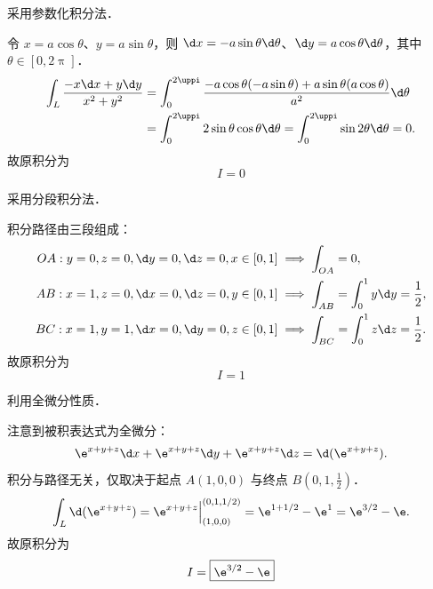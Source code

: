 \begin{solution}
    采用参数化积分法．

    令 $x = a \cos \theta$、$y = a \sin \theta$，则 $\d x = -a \sin \theta \d \theta$、$\d y = a \cos \theta \d \theta$，其中 $\theta \in [0, 2\uppi]$．
    \begin{equation}
        \begin{aligned}
            \int_L \frac{-x \d x + y \d y}{x^2 + y^2} & = \int_0^{2\uppi} \frac{-a \cos \theta (-a \sin \theta) + a \sin \theta (a \cos \theta)}{a^2} \d \theta \\
                                                      & = \int_0^{2\uppi} 2 \sin \theta \cos \theta \d \theta = \int_0^{2\uppi} \sin 2\theta \d \theta = 0.
        \end{aligned}
    \end{equation}
    故原积分为
    \begin{equation}
        I = \boxed{0}
    \end{equation}

    采用分段积分法．

    积分路径由三段组成：
    \begin{equation}
        \begin{aligned}
            OA: y=0, z=0, \d y=0, \d z=0, x \in [0, 1] & \implies \int_{OA} = 0,                             \\
            AB: x=1, z=0, \d x=0, \d z=0, y \in [0, 1] & \implies \int_{AB} = \int_0^1 y \d y = \frac{1}{2}, \\
            BC: x=1, y=1, \d x=0, \d y=0, z \in [0, 1] & \implies \int_{BC} = \int_0^1 z \d z = \frac{1}{2}.
        \end{aligned}
    \end{equation}
    故原积分为
    \begin{equation}
        I = \boxed{1}
    \end{equation}

    利用全微分性质．

    注意到被积表达式为全微分：
    \begin{equation}
        \e^{x+y+z} \d x + \e^{x+y+z} \d y + \e^{x+y+z} \d z = \d (\e^{x+y+z}).
    \end{equation}
    积分与路径无关，仅取决于起点 $A(1,0,0)$ 与终点 $B(0,1,\frac{1}{2})$．
    \begin{equation}
        \int_L \d (\e^{x+y+z}) = \e^{x+y+z} \Big|_{(1,0,0)}^{(0,1,1/2)} = \e^{1+1/2} - \e^1 = \e^{3/2} - \e.
    \end{equation}
    故原积分为
    \begin{equation}
        I = \boxed{\e^{3/2} - \e}
    \end{equation}


\end{solution}
